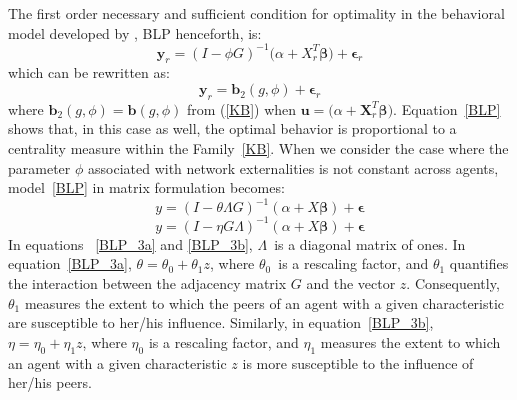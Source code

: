\documentclass[nojss]{jss}
\begin{document}
The first order necessary and sufficient condition for optimality in the behavioral model developed by \citep{Battaglini+Sciabolazza+Patacchini:2018}, BLP henceforth, is: 
\begin{equation}
\mathbf{y}_{r}=\left(I-\phi G\right) ^{-1}(\alpha
+X_{r}^{T}\mathbf{\beta )}+\mathbf{\epsilon }_{r}
\label{BLP0}
\end{equation}
which can be rewritten as:
\begin{equation}
\mathbf{y}_{r}=\boldsymbol{b}_{2}\left( g,\phi \right)+\mathbf{\epsilon}_{r}  
\label{BLP}
\end{equation}
where $\boldsymbol{b}_{2}\left( g,\phi \right) =\boldsymbol{b}\left( g,\phi
\right) $ from (\ref{KB}) when $\boldsymbol{u}=(\alpha +\boldsymbol{X}_{r}^{T}\mathbf{\beta)}$. Equation~\ref{BLP} shows that, in this case as well, the optimal behavior is proportional to a centrality measure within the Family~\ref{KB}.
When we consider the case where the parameter $\phi$ associated with network externalities is not constant across agents, model~\ref{BLP} in matrix formulation becomes:
\begin{equation}
y=(I-\theta \Lambda G)^{-1}(\alpha +X\mathbf{\beta })+\mathbf{\epsilon}
\label{BLP_3a}
\end{equation}
\begin{equation}
y=(I-\eta G\Lambda)^{-1}(\alpha +X\mathbf{\beta })+\mathbf{\epsilon}
\label{BLP_3b}
\end{equation}
In equations ~\ref{BLP_3a} and \ref{BLP_3b}, $\Lambda $\ is a diagonal matrix of ones. In equation~\ref{BLP_3a}, $\theta =\theta _{0}+\theta _{1}z$, where $\theta _{0}$\ is a rescaling factor, and $\theta _{1}$ quantifies the interaction between the adjacency matrix $G$ and the vector $z$. Consequently, $\theta _{1}$ measures the extent to which the peers of an agent with a given characteristic are susceptible to her/his influence. Similarly, in equation~\ref{BLP_3b}, $\eta =\eta _{0}+\eta _{1}z$, where $\eta _{0}$ is a rescaling factor, and $\eta _{1}$ measures the extent to which an agent with a given characteristic $z$ is more susceptible to the influence of her/his peers.
\end{document}
